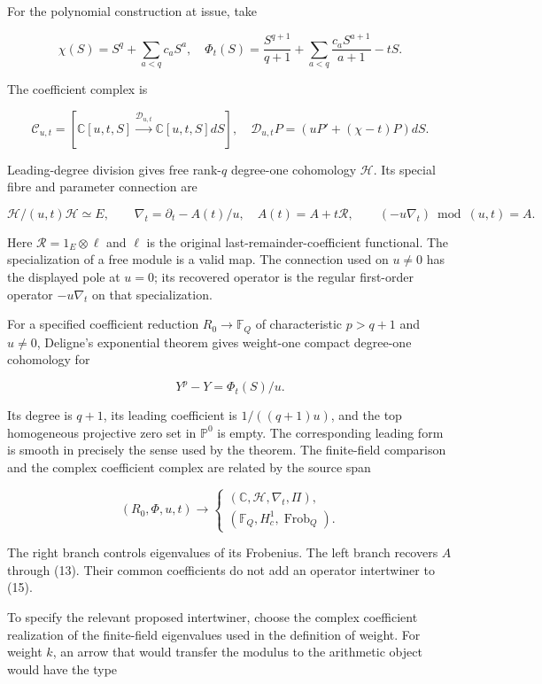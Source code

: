 \documentclass[
  11pt,
]{article}
\begin{document}
For the polynomial construction at issue, take

\[
\chi(S)=S^q+\sum_{a<q}c_aS^a,\quad
\Phi_t(S)=\frac{S^{q+1}}{q+1}
+\sum_{a<q}\frac{c_aS^{a+1}}{a+1}-tS.
\tag{11}
\]

The coefficient complex is

\[
\mathcal C_{u,t}=
[\mathbb C[u,t,S]\xrightarrow{\mathcal D_{u,t}}\mathbb C[u,t,S]dS],
\quad \mathcal D_{u,t}P=(uP'+(\chi-t)P)dS.
\tag{12}
\]

Leading-degree division gives free rank-\(q\) degree-one cohomology
\(\mathcal H\). Its special fibre and parameter connection are

\[
\mathcal H/(u,t)\mathcal H\simeq E,\qquad
\nabla_t=\partial_t-A(t)/u,\quad A(t)=A+t\mathcal R,\qquad
(-u\nabla_t)\bmod(u,t)=A.
\tag{13}
\]

Here \(\mathcal R=1_E\otimes\ell\) and \(\ell\) is the original
last-remainder-coefficient functional. The specialization of a free
module is a valid map. The connection used on \(u\ne0\) has the
displayed pole at \(u=0\); its recovered operator is the regular
first-order operator \(-u\nabla_t\) on that specialization.

For a specified coefficient reduction \(R_0\to\mathbb F_Q\) of
characteristic \(p>q+1\) and \(u\ne0\), Deligne's exponential theorem
gives weight-one compact degree-one cohomology for

\[
Y^p-Y=\Phi_t(S)/u.
\tag{14}
\]

Its degree is \(q+1\), its leading coefficient is \(1/((q+1)u)\), and
the top homogeneous projective zero set in \(\mathbb P^0\) is empty. The
corresponding leading form is smooth in precisely the sense used by the
theorem. The finite-field comparison and the complex coefficient complex
are related by the source span

\[
(R_0,\Phi,u,t)\longrightarrow
\begin{cases}
(\mathbb C,\mathcal H,\nabla_t,\Pi),\\
(\mathbb F_Q,H_c^1,\operatorname{Frob}_Q).
\end{cases}
\tag{15}
\]

The right branch controls eigenvalues of its Frobenius. The left branch
recovers \(A\) through (13). Their common coefficients do not add an
operator intertwiner to (15).

To specify the relevant proposed intertwiner, choose the complex
coefficient realization of the finite-field eigenvalues used in the
definition of weight. For weight \(k\), an arrow that would transfer the
modulus to the arithmetic object would have the type
\end{document}
